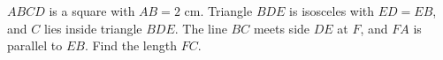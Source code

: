 $ABCD$ is a square with $AB=2$ cm. Triangle $BDE$ is isosceles with $ED=EB$, and $C$ lies inside triangle $BDE$. The line $BC$ meets side $DE$ at $F$, and $FA$ is parallel to $EB$. Find the length $FC$.
